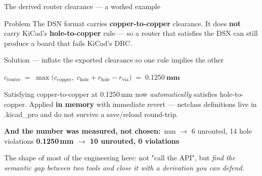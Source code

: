 \documentclass[aspectratio=169,10pt]{beamer}
\newcommand{\code}[1]{{\ttfamily\small #1}}
\begin{document}
\begin{frame}{The derived router clearance --- a worked example}
\vspace{0mm}
\begin{block}{Problem}
\small
The DSN format carries \textbf{copper-to-copper} clearance. It does \textbf{not} carry KiCad's \textbf{hole-to-copper} rule --- so a router that satisfies the DSN can still produce a board that fails KiCad's DRC.
\end{block}
\vspace{1mm}
\begin{block}{Solution --- inflate the exported clearance so one rule implies the other}
\vspace{1mm}
\begin{center}\large
$c_{\text{router}} \;=\; \max\bigl(c_{\text{copper}},\; c_{\text{hole}} + r_{\text{hole}} - r_{\text{via}}\bigr) \;=\; \mathbf{0.1250\ mm}$
\end{center}
\vspace{1mm}
\small
Satisfying copper-to-copper at 0.1250\,mm now \emph{automatically} satisfies hole-to-copper. Applied \textbf{in memory} with immediate revert --- netclass definitions live in \code{.kicad\_pro} and do not survive a save/reload round-trip.
\end{block}
\vspace{1mm}
\begin{center}\footnotesize
\textbf{And the number was measured, not chosen:} \,mm $\rightarrow$ 6 unrouted, \alert{14 hole violations} \quad\textbullet\quad
\textbf{0.1250\,mm $\rightarrow$ 10 unrouted, 0 violations}
\end{center}
\vspace{1mm}
\begin{center}\footnotesize\color{stgrey}
The shape of most of the engineering here: not "call the API", but \emph{find the semantic gap between two tools and close it with a derivation you can defend}.
\end{center}
\end{frame}
\end{document}
